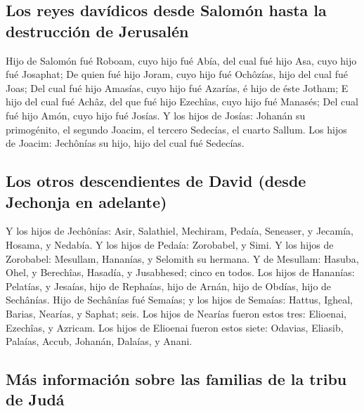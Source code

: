 \hypertarget{los-reyes-davuxeddicos-desde-salomuxf3n-hasta-la-destrucciuxf3n-de-jerusaluxe9n}{%
\subsection{Los reyes davídicos desde Salomón hasta la destrucción de
Jerusalén}\label{los-reyes-davuxeddicos-desde-salomuxf3n-hasta-la-destrucciuxf3n-de-jerusaluxe9n}}

 Hijo de Salomón fué Roboam, cuyo hijo fué Abía, del cual
fué hijo Asa, cuyo hijo fué Josaphat;  De quien fué hijo
Joram, cuyo hijo fué Ochôzías, hijo del cual fué Joas;  Del
cual fué hijo Amasías, cuyo hijo fué Azarías, é hijo de éste Jotham;
 E hijo del cual fué Achâz, del que fué hijo Ezechîas, cuyo
hijo fué Manasés;  Del cual fué hijo Amón, cuyo hijo fué
Josías.  Y los hijos de Josías: Johanán su primogénito, el
segundo Joacim, el tercero Sedecías, el cuarto Sallum.  Los
hijos de Joacim: Jechônías su hijo, hijo del cual fué Sedecías.

\hypertarget{los-otros-descendientes-de-david-desde-jechonja-en-adelante}{%
\subsection{Los otros descendientes de David (desde Jechonja en
adelante)}\label{los-otros-descendientes-de-david-desde-jechonja-en-adelante}}

 Y los hijos de Jechônías: Asir, Salathiel, 
Mechiram, Pedaía, Seneaser, y Jecamía, Hosama, y Nedabía. 
Y los hijos de Pedaía: Zorobabel, y Simi. Y los hijos de Zorobabel:
Mesullam, Hananías, y Selomith su hermana.  Y de Mesullam:
Hasuba, Ohel, y Berechîas, Hasadía, y Jusabhesed; cinco en todos.
 Los hijos de Hananías: Pelatías, y Jesaías, hijo de
Rephaías, hijo de Arnán, hijo de Obdías, hijo de Sechânías.
 Hijo de Sechânías fué Semaías; y los hijos de Semaías:
Hattus, Igheal, Barias, Nearías, y Saphat; seis.  Los hijos
de Nearías fueron estos tres: Elioenai, Ezechîas, y Azricam.
 Los hijos de Elioenai fueron estos siete: Odavias,
Eliasib, Palaías, Accub, Johanán, Dalaías, y Anani.

\hypertarget{muxe1s-informaciuxf3n-sobre-las-familias-de-la-tribu-de-juduxe1}{%
\subsection{Más información sobre las familias de la tribu de
Judá}\label{muxe1s-informaciuxf3n-sobre-las-familias-de-la-tribu-de-juduxe1}}

